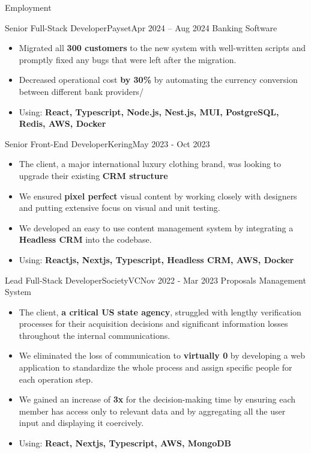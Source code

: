 \documentclass[]{mcdowellcv}
\begin{document}
	\makeheader
	
	\begin{cvsection}{Employment}
		\begin{cvsubsection}{Senior Full-Stack Developer}{Payset}{Apr 2024 -- Aug 2024}
			Banking Software
			\begin{itemize}
				\item Migrated all \textbf{300 customers} to the new system with well-written scripts and promptly fixed any bugs that were left after the migration.
				\item Decreased operational cost \textbf{by 30\%} by automating the currency conversion between different bank providers/
				\item Using: \textbf{React, Typescript, Node.js, Nest.js, MUI, PostgreSQL, Redis, AWS, Docker}
			\end{itemize}
		\end{cvsubsection}

		\begin{cvsubsection}{Senior Front-End Developer}{Kering}{May 2023 - Oct 2023}
			\begin{itemize}
				\item The client, a major international luxury clothing brand, was looking to upgrade their existing \textbf{CRM structure}
				\item We ensured \textbf{pixel perfect} visual content by working closely with designers and putting extensive focus on visual and unit testing.
				\item We developed an easy to use content management system by integrating a \textbf{Headless CRM} into the codebase.
				\item Using: \textbf{Reactjs, Nextjs, Typescript, Headless CRM, AWS, Docker}
			\end{itemize}
		\end{cvsubsection}

		\begin{cvsubsection}{Lead Full-Stack Developer}{SocietyVC}{Nov 2022 - Mar 2023}
			Proposals Management System
			\begin{itemize}
				\item The client, \textbf{a critical US state agency}, struggled with lengthy verification processes for their acquisition decisions and significant information losses throughout the internal communications.
				\item We eliminated the loss of communication to \textbf{virtually 0} by developing a web application to standardize the whole process and assign specific people for each operation step.
				\item We gained an increase of \textbf{3x} for the decision-making time by ensuring each member has access only to relevant data and by aggregating all the user input and displaying it coercively.
				\item Using: \textbf{React, Nextjs, Typescript, AWS, MongoDB}
			\end{itemize}
		\end{cvsubsection}



\end{cvsection}
\end{document}
